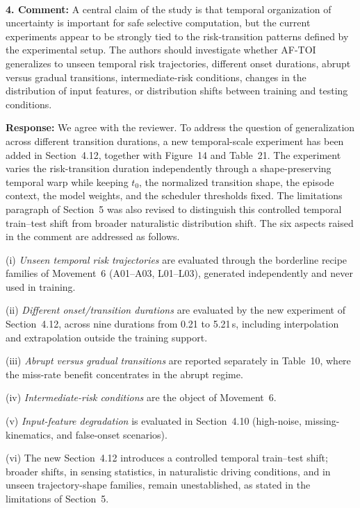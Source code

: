 \documentclass[1p,12pt,authoryear]{elsarticle}
\begin{document}
~

\noindent \textbf{4. Comment:} A central claim of the study is that temporal organization of uncertainty is important for safe selective computation, but the current experiments appear to be strongly tied to the risk-transition patterns defined by the experimental setup. The authors should investigate whether AF-TOI generalizes to unseen temporal risk trajectories, different onset durations, abrupt versus gradual transitions, intermediate-risk conditions, changes in the distribution of input features, or distribution shifts between training and testing conditions.

\vspace{2mm}
\noindent \textbf{Response:} We agree with the reviewer. To address the question of generalization across different transition durations, a new temporal-scale experiment has been added in Section~4.12, together with Figure~14 and Table~21. The experiment varies the risk-transition duration independently through a shape-preserving temporal warp while keeping $t_0$, the normalized transition shape, the episode context, the model weights, and the scheduler thresholds fixed. The limitations paragraph of Section~5 was also revised to distinguish this controlled temporal train--test shift from broader naturalistic distribution shift. The six aspects raised in the comment are addressed as follows.

(i) \emph{Unseen temporal risk trajectories} are evaluated through the borderline recipe families of Movement~6 (A01--A03, L01--L03), generated independently and never used in training.

(ii) \emph{Different onset/transition durations} are evaluated by the new experiment of Section~4.12, across nine durations from 0.21 to 5.21\,s, including interpolation and extrapolation outside the training support.

(iii) \emph{Abrupt versus gradual transitions} are reported separately in Table~10, where the miss-rate benefit concentrates in the abrupt regime.

(iv) \emph{Intermediate-risk conditions} are the object of Movement~6.

(v) \emph{Input-feature degradation} is evaluated in Section~4.10 (high-noise, missing-kinematics, and false-onset scenarios).

(vi) The new Section~4.12 introduces a controlled temporal train--test shift; broader shifts, in sensing statistics, in naturalistic driving conditions, and in unseen trajectory-shape families, remain unestablished, as stated in the limitations of Section~5.
\end{document}

